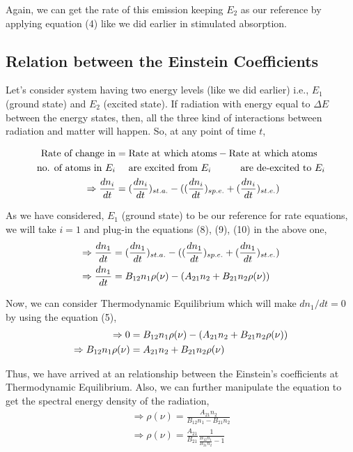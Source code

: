 \documentclass[12pt]{article}
\begin{document}
Again, we can get the rate of this emission keeping $E_{2}$ as our reference by applying equation (4) like we did earlier in stimulated absorption.

\subsection{Relation between the Einstein Coefficients}

Let's consider system having two energy levels (like we did earlier) i.e., $E_{1}$ (ground state) and $E_{2}$ (excited state). If radiation with energy equal to $\Delta E$ between the energy states, then, all the three kind of interactions between radiation and matter will happen. So, at any point of time $t$,

\begin{align}
    \text{Rate of change in} & = \text{Rate at which atoms} - \text{Rate at which atoms} \notag \\
    \text{no. of atoms in } E_{i} & \quad \text{ are excited from } E_{i} \quad \qquad \text{are de-excited to } E_{i} \notag \\
    \Rightarrow \frac{dn_{i}}{dt} & = (\frac{dn_{i}}{dt})_{st.a.} - ((\frac{dn_{i}}{dt})_{sp.e.} + (\frac{dn_{i}}{dt})_{st.e.}) \notag
\end{align}

As we have considered, $E_{1}$ (ground state) to be our reference for rate equations, we will take $i = 1$ and plug-in the equations (8), (9), (10) in the above one,
\begin{align}
    \Rightarrow \frac{dn_{1}}{dt} & = (\frac{dn_{1}}{dt})_{st.a.} - ((\frac{dn_{1}}{dt})_{sp.e.} + (\frac{dn_{1}}{dt})_{st.e.}) \notag \\
    \Rightarrow \frac{dn_{1}}{dt} & = B_{12}n_{1}\rho(\nu) - (A_{21}n_{2} + B_{21}n_{2}\rho(\nu))
\end{align}

Now, we can consider Thermodynamic Equilibrium which will make $dn_{1}/dt = 0$ by using the equation (5), 
\begin{align}
    \Rightarrow 0 & = B_{12}n_{1}\rho(\nu) - (A_{21}n_{2} + B_{21}n_{2}\rho(\nu)) \notag \\
    \Rightarrow B_{12}n_{1}\rho(\nu) & = A_{21}n_{2} + B_{21}n_{2}\rho(\nu)
\end{align}

Thus, we have arrived at an relationship between the Einstein's coefficients at Thermodynamic Equilibrium. 
Also, we can further manipulate the equation to get the spectral energy density of the radiation,
\begin{align*}
    \Rightarrow \rho(\nu) = \frac{A_{21}n_{2}}{B_{12}n_{1} - B_{21}n_{2}} \\
    \Rightarrow \rho(\nu) = \frac{A_{21}}{B_{21}} \frac{1}{\frac{B_{12}n_{1}}{B_{21}n_{2}} - 1}
\end{align*}
\end{document}

